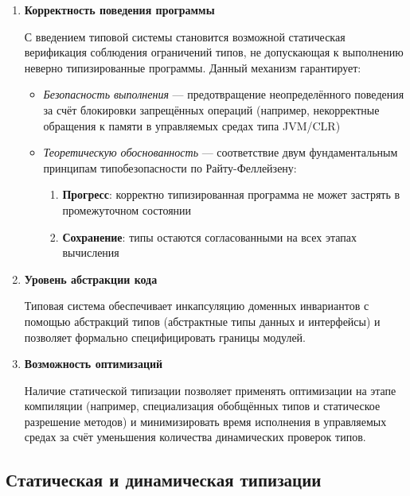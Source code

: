 \begin{enumerate}[label=\arabic*), leftmargin=*]
    \item \textbf{Корректность поведения программы}

    С введением типовой системы становится возможной статическая верификация соблюдения ограничений типов, не допускающая к выполнению неверно типизированные программы. Данный механизм гарантирует:

    \begin{itemize}
        \item \textit{Безопасность выполнения} — предотвращение неопределённого поведения за счёт блокировки запрещённых операций (например, некорректные обращения к памяти в управляемых средах типа JVM/CLR)
        \item \textit{Теоретическую обоснованность} — соответствие двум фундаментальным принципам типобезопасности по Райту-Феллейзену:
        \begin{enumerate}[label=\arabic*., leftmargin=*]
            \item \textbf{Прогресс}: корректно типизированная программа не может застрять в промежуточном состоянии
            \item \textbf{Сохранение}: типы остаются согласованными на всех этапах вычисления
        \end{enumerate}
    \end{itemize}

    \item \textbf{Уровень абстракции кода}

    Типовая система обеспечивает инкапсуляцию доменных инвариантов с помощью абстракций типов (абстрактные типы данных и интерфейсы) и позволяет формально специфицировать границы модулей.

    \item \textbf{Возможность оптимизаций}

    Наличие статической типизации позволяет применять оптимизации на этапе компиляции (например, специализация обобщённых типов и статическое разрешение методов) и минимизировать время исполнения в управляемых средах за счёт уменьшения количества динамических проверок типов.
\end{enumerate}

\subsection{Статическая и динамическая типизации}

